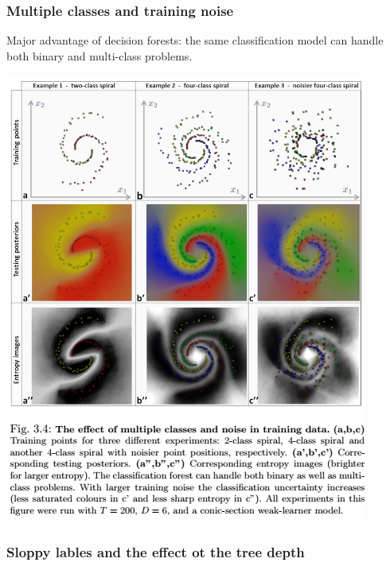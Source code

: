 \documentclass{scrartcl}
\begin{document}
\begin{appendices}
\subsubsection{Multiple classes and training noise}
Major advantage of decision forests: the same classification model can handle both binary and multi-class problems.

\begin{center}
    \includegraphics[scale=1]{img/forestmulticlass}
\end{center}

\subsubsection{Sloppy lables and the effect ot the tree depth}


\end{appendices}
\end{document}
